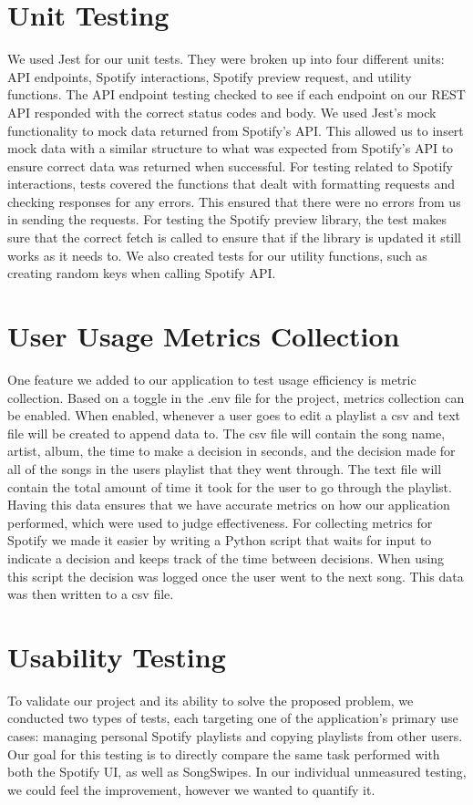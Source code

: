 \documentclass{article}
\begin{document}
\section{Unit Testing}
\quad \quad We used Jest for our unit tests.  They were broken up into four different units: API endpoints, Spotify interactions, Spotify preview request, and utility functions. The API endpoint testing checked to see if each endpoint on our REST API responded with the correct status codes and body. We used Jest's mock functionality to mock data returned from Spotify's API. This allowed us to insert mock data with a similar structure to what was expected from Spotify's API to ensure correct data was returned when successful. For testing related to Spotify interactions, tests covered the functions that dealt with formatting requests and checking responses for any errors. This ensured that there were no errors from us in sending the requests. For testing the Spotify preview library, the test makes sure that the correct fetch is called to ensure that if the library is updated it still works as it needs to. We also created tests for our utility functions, such as creating random keys when calling Spotify API.

\section{User Usage Metrics Collection}
\quad One feature we added to our application to test usage efficiency is metric collection. Based on a toggle in the .env file for the project, metrics collection can be enabled. When enabled, whenever a user goes to edit a playlist a csv and text file will be created to append data to. The csv file will contain the song name, artist, album, the time to make a decision in seconds, and the decision made for all of the songs in the users playlist that they went through. The text file will contain the total amount of time it took for the user to go through the playlist. Having this data ensures that we have accurate metrics on how our application performed, which were used to judge effectiveness. For collecting metrics for Spotify we made it easier by writing a Python script that waits for input to indicate a decision and keeps track of the time between decisions. When using this script the decision was logged once the user went to the next song. This data was then written to a csv file. 

\section{Usability Testing}
\quad To validate our project and its ability to solve the proposed problem, we conducted two types of tests, each targeting one of the application's primary use cases: managing personal Spotify playlists and copying playlists from other users. Our goal for this testing is to directly compare the same task performed with both the Spotify UI, as well as SongSwipes. In our individual unmeasured testing, we could feel the improvement, however we wanted to quantify it.
\end{document}
